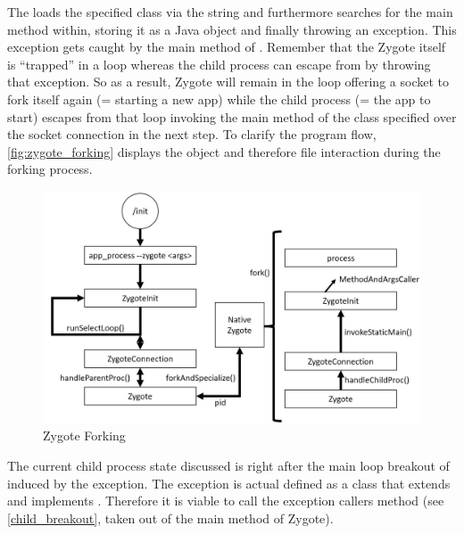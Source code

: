 The  loads the specified class via the  string and furthermore searches for the main method within, storing it as a Java  object and finally throwing an
 exception. This exception gets caught by the main method of .
Remember that the Zygote itself is ``trapped'' in a loop whereas the child process can escape from by throwing that exception. So as a result, Zygote will remain in the loop offering a socket to fork itself again (= starting a new app) while the child process (= the app to start) escapes from that loop invoking the main method of the class specified over the socket
connection in the next step.
To clarify the program flow, \autoref{fig:zygote_forking} displays
the object and therefore file interaction during the forking process.

\begin{figure}[htb]
  \centering
  \includegraphics[width={\textwidth}]{figures/zygote_forking}
  \caption[Zygote Forking]{Zygote Forking}
  \label{fig:zygote_forking}
\end{figure}


The current child process state discussed is right after the main loop
breakout of  induced by the exception. The exception
is actual defined as a class that extends  and implements
. Therefore it is viable to call the exception callers
 method (see \autoref{child_breakout}, taken out of the main
method of Zygote).





